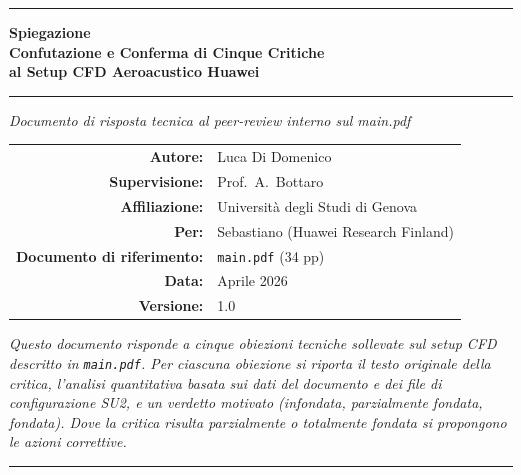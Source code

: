 \documentclass[11pt,a4paper]{article}
\begin{document}

\begin{titlepage}
  \centering
  \vspace*{1.5cm}
  {\color{huaweiblue}\rule{\linewidth}{1.5pt}}
  \vspace{0.6cm}

  {\LARGE\bfseries\color{huaweiblue}
    Spiegazione \\[0.3cm]
    Confutazione e Conferma di Cinque Critiche \\[0.2cm]
    al Setup CFD Aeroacustico Huawei
  }

  \vspace{0.4cm}
  {\color{midblue}\rule{\linewidth}{0.8pt}}

  \vspace{0.8cm}
  {\large\itshape Documento di risposta tecnica al peer-review interno
    sul main.pdf}

  \vspace{2.0cm}

  \begin{tabular}{rl}
    \textbf{Autore:}        & Luca Di Domenico \\
    \textbf{Supervisione:}  & Prof.\ A.\ Bottaro \\
    \textbf{Affiliazione:}  & Università degli Studi di Genova \\
    \textbf{Per:}           & Sebastiano (Huawei Research Finland) \\
    \textbf{Documento di riferimento:} & \texttt{main.pdf} (34 pp) \\
    \textbf{Data:}          & Aprile 2026 \\
    \textbf{Versione:}      & 1.0 \\
  \end{tabular}

  \vfill
  \begin{minipage}{0.88\linewidth}
    \centering
    \itshape
    Questo documento risponde a cinque obiezioni tecniche sollevate
    sul setup CFD descritto in \texttt{main.pdf}. Per ciascuna obiezione
    si riporta il testo originale della critica, l'analisi
    quantitativa basata sui dati del documento e dei file di
    configurazione SU2, e un verdetto motivato (\emph{infondata},
    \emph{parzialmente fondata}, \emph{fondata}). Dove la critica
    risulta parzialmente o totalmente fondata si propongono le
    azioni correttive.
  \end{minipage}

  \vspace{0.6cm}
  {\color{huaweiblue}\rule{\linewidth}{1.5pt}}
\end{titlepage}
\end{document}
